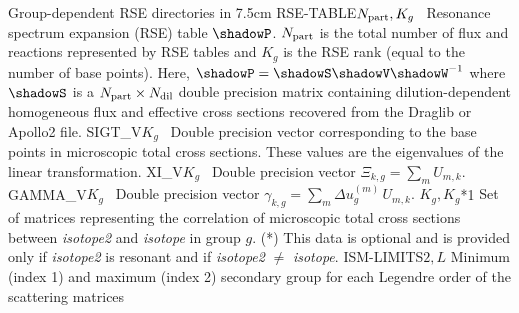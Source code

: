 \vskip -0.4cm

\begin{DescriptionEnregistrement}{Group-dependent RSE directories in }{7.5cm}\label{table:rse}
\DbleEnr
  {RSE-TABLE}{$N_{\rm part}, K_g$}{~}
  {Resonance spectrum expansion (RSE) table $\shadowP$. $N_{\rm part}$ is the total number of flux and reactions
  represented by RSE tables and $K_g$ is the RSE rank (equal to the number of base points). Here, $\shadowP=\shadowS\shadowV \shadowW^{-1}$
  where $\shadowS$ is a $N_{\rm part} \times N_{\rm dil}$ double precision matrix containing dilution-dependent
  homogeneous flux and effective cross sections recovered from the Draglib or Apollo2 file.}
\DbleEnr
  {SIGT\_V}{$K_g$}{~}
  {Double precision vector corresponding to the base points in microscopic total cross sections. These
  values are the eigenvalues of the linear transformation.}
\DbleEnr
  {XI\_V}{$K_g$}{~}
  {Double precision vector $\Xi_{k,g}=\sum_m U_{m,k}$.}
\DbleEnr
  {GAMMA\_V}{$K_g$}{~}
  {Double precision vector $\gamma_{k,g}=\sum_m \Delta u_g^{(m)}\, U_{m,k}$.}
\OptDbleVar
  {}{$K_g,K_g$}{*}{1}
  {Set of matrices representing the correlation of microscopic total cross sections between {\sl isotope2} and {\sl isotope} in group $g$. (*) This data is optional
  and is provided only if {\sl isotope2} is resonant and if {\sl isotope2} $\neq$ {\sl isotope}.}
\IntEnr
  {ISM-LIMITS}{$2,L$}
  {Minimum (index 1) and maximum (index 2) secondary group for each Legendre
   order of the scattering matrices}
\end{DescriptionEnregistrement}
\eject
